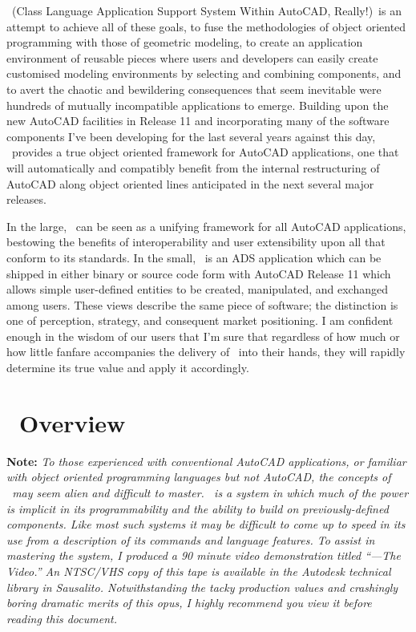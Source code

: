 \documentclass{article}
\begin{document}
\cw\ ({\sf Class Language Application Support System Within
AutoCAD, Really!})\ is an attempt to achieve all of these goals, to
fuse the methodologies of object oriented programming with those of
geometric modeling, to create an application environment of reusable
pieces where users and developers can easily create customised
modeling environments by selecting and combining components, and to
avert the chaotic and bewildering consequences that seem
inevitable were hundreds of mutually incompatible applications to
emerge.  Building upon the new AutoCAD facilities in Release 11 and
incorporating many of the software components I've been developing for
the last several years against this day, \cw\ provides
a true object oriented framework for AutoCAD applications, one that
will automatically and compatibly benefit from the internal
restructuring of AutoCAD along object oriented lines anticipated in
the next several major releases.

In the large, \cw\ can be seen as a unifying framework for all
AutoCAD applications, bestowing the benefits of interoperability and
user extensibility upon all that conform to its standards.  In the
small, \cw\ is an ADS application which can be shipped in
either binary or source code form with AutoCAD Release 11 which allows
simple user-defined entities to be created, manipulated, and exchanged
among users.  These views describe the same piece of software; the
distinction is one of perception, strategy, and consequent market
positioning.  I am confident enough in the wisdom of our users that
I'm sure that regardless of how much or how little fanfare accompanies the
delivery of \cw\ into their hands, they will rapidly determine its
true value and apply it accordingly.

\section{\cw\ Overview}

{\bf Note:} {\sl To those experienced with conventional AutoCAD
applications, or familiar with object oriented programming languages
but not AutoCAD, the concepts of \cw\ may seem alien and difficult to
master.  \cw\ is a system in which much of the power is implicit in
its programmability and the ability to build on previously-defined
components.  Like most such systems it may be difficult to come up
to speed in its use from a description of its commands and language
features.  To assist in mastering the system, I produced a 90 minute
video demonstration titled ``{\cw---{\sc The Video}}.''  An NTSC/VHS copy
of this tape is available in the Autodesk technical library in
Sausalito.  Notwithstanding the tacky production values and crashingly
boring dramatic merits of this opus, I highly recommend you view it
before reading this document.}
\end{document}

